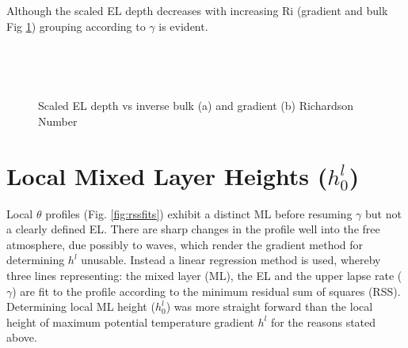 Although the scaled \acs{EL} depth decreases with increasing \acs{Ri} (gradient and bulk Fig \ref{fig:scaledeltahinvri})
grouping according to $\gamma$ is evident.\\

\begin{figure}[htbp]
\begin{minipage}[b]{0.5\linewidth}
        \\
        \end{minipage}             
\quad
\begin{minipage}[b]{0.5\linewidth}
        \\
       
       \end{minipage}
        \caption{Scaled EL depth vs inverse bulk (a)  and gradient (b) Richardson Number}
        \label{fig:scaledeltahinvri}
\end{figure}

\clearpage

\section{Local Mixed Layer Heights ($h_{0}^{l}$)}
\label{sec:locmlh}     
\FloatBarrier

Local $\theta$ profiles (Fig. \ref{fig:rssfits}) exhibit a distinct \acs{ML} before resuming $\gamma$ but not 
a clearly defined \acs{EL}. There are sharp changes in the profile well into the free atmosphere, due possibly to 
waves, which render the gradient method for determining $h^{l}$ unusable.  Instead a linear regression method is used, 
whereby three lines representing: the mixed layer (ML), the EL and the upper lapse rate ($\gamma$) are fit to the 
profile according to the minimum residual sum of squares (RSS).  Determining local \acs{ML} height ($h_{0}^{l}$) was 
more straight forward than the local height of maximum potential temperature gradient $h^{l}$ for the reasons stated 
above.\\  

